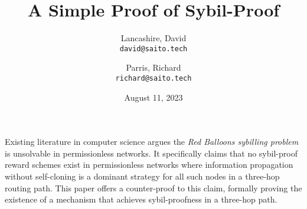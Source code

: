 \documentclass[oneside]{article}   	%
\title{A Simple Proof of Sybil-Proof}
\author{
  Lancashire, David\\
  \texttt{david@saito.tech}
  \and
  Parris, Richard\\
  \texttt{richard@saito.tech}
}
\date{August 11, 2023}
\begin{document}
\maketitle

\begin{onecolabstract}
Existing literature in computer science argues the \textit{Red Balloons sybilling problem} is unsolvable in permissionless networks. It specifically claims that no sybil-proof reward schemes exist in permissionless networks where information propagation without self-cloning is a dominant strategy for all such nodes in a three-hop routing path. This paper offers a counter-proof to this claim, formally proving the existence of a mechanism that achieves sybil-proofness in a three-hop path.
\end{onecolabstract}

\bigskip 
\bigskip 
\end{document}
